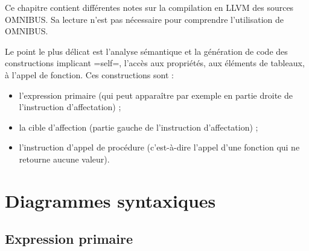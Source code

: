 





Ce chapitre contient différentes notes sur la compilation en LLVM des sources OMNIBUS. Sa lecture n'est pas nécessaire pour comprendre l'utilisation de OMNIBUS.


Le point le plus délicat est l'analyse sémantique et la génération de code des constructions implicant \omnibus=self=, l'accès aux propriétés, aux éléments de tableaux, à l'appel de fonction. Ces constructions sont :
\begin{itemize}
  \item l'expression primaire (qui peut apparaître par exemple en partie droite de l'instruction d'affectation) ;
  \item la cible d'affection (partie gauche de l'instruction d'affectation) ;
  \item l'instruction d'appel de procédure (c'est-à-dire l'appel d'une fonction qui ne retourne aucune valeur).
\end{itemize}

\section{Diagrammes syntaxiques}


\subsection{Expression primaire}


